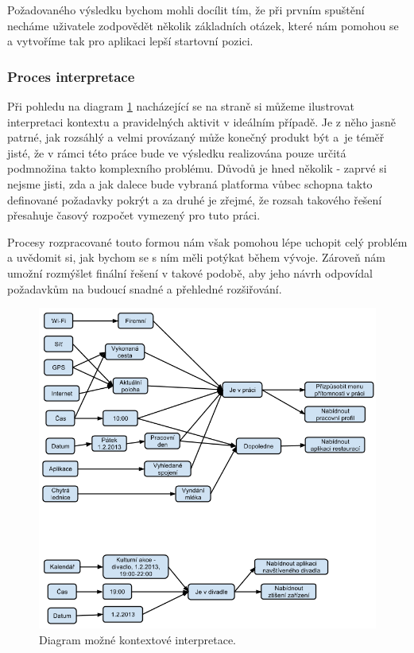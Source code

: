 \documentclass[thesis=M,czech]{FITthesis}[2012/06/26]
\begin{document}
Požadovaného výsledku bychom mohli docílit tím, že při prvním spuštění necháme uživatele zodpovědět několik základních otázek, které nám pomohou se  a vytvoříme tak pro aplikaci lepší startovní pozici.

\subsubsection*{Proces interpretace}
Při pohledu na diagram \ref{fig:interpreter} nacházející se na straně \pageref{fig:interpreter} si můžeme ilustrovat interpretaci kontextu a pravidelných aktivit v ideálním případě. Je z něho jasně patrné, jak rozsáhlý a velmi provázaný může konečný produkt být a~je téměř jisté, že v rámci této práce bude ve výsledku realizována pouze určitá podmnožina takto komplexního problému. Důvodů je hned několik - zaprvé si nejsme jisti, zda a jak dalece bude vybraná platforma vůbec schopna takto definované požadavky pokrýt a za druhé je zřejmé, že rozsah takového řešení přesahuje časový rozpočet vymezený pro tuto práci.

Procesy rozpracované touto formou nám však pomohou lépe uchopit celý problém a uvědomit si, jak bychom se s ním měli potýkat během vývoje. Zároveň nám umožní rozmýšlet finální řešení v takové podobě, aby jeho návrh odpovídal požadavkům na budoucí snadné a přehledné rozšiřování.

\begin{figure}\centering
	\includegraphics[width=1\textwidth]{figures/interpreter_process}
	\caption{Diagram možné kontextové interpretace.}
	\label{fig:interpreter}
\end{figure}
\end{document}
